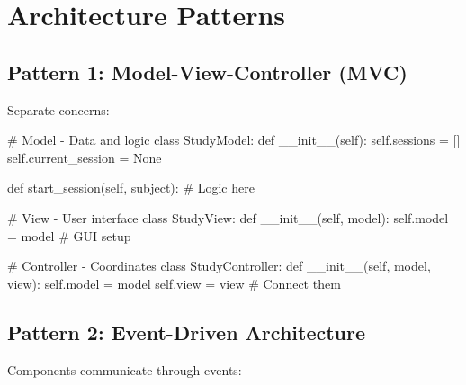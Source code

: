 \documentclass[
  letterpaper,
  DIV=11,
  numbers=noendperiod,
  oneside]{scrreprt}
\newenvironment{Shaded}{}{}
\newcommand{\CommentTok}[1]{\textcolor[rgb]{0.42,0.45,0.49}{#1}}
\newcommand{\FunctionTok}[1]{\textcolor[rgb]{0.44,0.26,0.76}{#1}}
\newcommand{\KeywordTok}[1]{\textcolor[rgb]{0.84,0.23,0.29}{#1}}
\newcommand{\NormalTok}[1]{\textcolor[rgb]{0.14,0.16,0.18}{#1}}
\newcommand{\OperatorTok}[1]{\textcolor[rgb]{0.14,0.16,0.18}{#1}}
\newcommand{\VariableTok}[1]{\textcolor[rgb]{0.89,0.38,0.04}{#1}}
\begin{document}
\section{Architecture Patterns}\label{architecture-patterns}

\subsection{Pattern 1: Model-View-Controller
(MVC)}\label{pattern-1-model-view-controller-mvc}

Separate concerns:

\begin{Shaded}
\begin{Highlighting}[]
\CommentTok{\# Model {-} Data and logic}
\KeywordTok{class}\NormalTok{ StudyModel:}
    \KeywordTok{def} \FunctionTok{\_\_init\_\_}\NormalTok{(}\VariableTok{self}\NormalTok{):}
        \VariableTok{self}\NormalTok{.sessions }\OperatorTok{=}\NormalTok{ []}
        \VariableTok{self}\NormalTok{.current\_session }\OperatorTok{=} \VariableTok{None}
    
    \KeywordTok{def}\NormalTok{ start\_session(}\VariableTok{self}\NormalTok{, subject):}
        \CommentTok{\# Logic here}
        
\CommentTok{\# View {-} User interface}
\KeywordTok{class}\NormalTok{ StudyView:}
    \KeywordTok{def} \FunctionTok{\_\_init\_\_}\NormalTok{(}\VariableTok{self}\NormalTok{, model):}
        \VariableTok{self}\NormalTok{.model }\OperatorTok{=}\NormalTok{ model}
        \CommentTok{\# GUI setup}
        
\CommentTok{\# Controller {-} Coordinates}
\KeywordTok{class}\NormalTok{ StudyController:}
    \KeywordTok{def} \FunctionTok{\_\_init\_\_}\NormalTok{(}\VariableTok{self}\NormalTok{, model, view):}
        \VariableTok{self}\NormalTok{.model }\OperatorTok{=}\NormalTok{ model}
        \VariableTok{self}\NormalTok{.view }\OperatorTok{=}\NormalTok{ view}
        \CommentTok{\# Connect them}
\end{Highlighting}
\end{Shaded}

\subsection{Pattern 2: Event-Driven
Architecture}\label{pattern-2-event-driven-architecture}

Components communicate through events:
\end{document}
